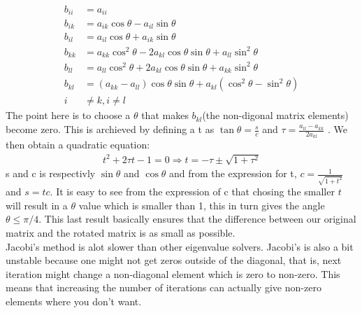 \documentclass[11pt, a4 paper]{report}
\newenvironment{tabbed}{\begin{addmargin}{0.1cm}}{\end{addmargin}}
\newcommand{\vsp}{\vspace{0.2cm}}
\begin{document}
\begin{tabbed}
        \begin{align*}
            b_{ii} &= a_{ii}\\
            b_{ik} &= a_{ik}\cos{\theta} - a_{il}\sin{\theta}\\
            b_{il} &= a_{il}\cos{\theta} + a_{ik}\sin{\theta}\\
            b_{kk} &= a_{kk}\cos^2{\theta} - 2a_{kl}\cos{\theta}\sin{\theta} + a_{ll}\sin^2{\theta}\\
            b_{ll} &= a_{ll}\cos^2{\theta} + 2a_{kl}\cos{\theta}\sin{\theta} + a_{kk}\sin^2{\theta}\\
            b_{kl} &= (a_{kk} - a_{ll})\cos{\theta}\sin{\theta} + a_{kl}(\cos^2{\theta} - \sin^2{\theta})\\
            i &\neq k, i \neq l
        \end{align*}
        The point here is to choose a $\theta$ that makes $b_{kl}$(the non-digonal matrix elements) become zero. This is archieved by defining a t as $\tan{\theta = \frac{s}{c}}$ and $\tau=\frac{a_{ll}-a_{kk}}{2a_{kl}}$ . We then obtain a quadratic equation:
        \begin{align*}
            t^2 + 2\tau t - 1 = 0 \Rightarrow t = -\tau \pm \sqrt{1+\tau^2}
        \end{align*}
        s and c is respectivly $\sin{\theta}$ and $\cos{\theta}$ and from the expression for t, $c = \frac{1}{\sqrt{1+t^2}}$ and $s=tc$. It is easy to see from the expression of c that chosing the smaller $t$ will result in a $\theta$ value which is smaller than 1, this in turn gives the angle $\theta \leq \pi/4$. This last result basically ensures that the difference between our original matrix and the rotated matrix is as small as possible.\vsp\\
        Jacobi's method is alot slower than other eigenvalue solvers. Jacobi's is also a bit unstable because one might not get zeros outside of the diagonal, that is, next iteration might change a non-diagonal element which is zero to non-zero. This means that increasing the number of iterations can actually give non-zero elements where you don't want.\vsp\\
    \end{tabbed}
\end{document}

